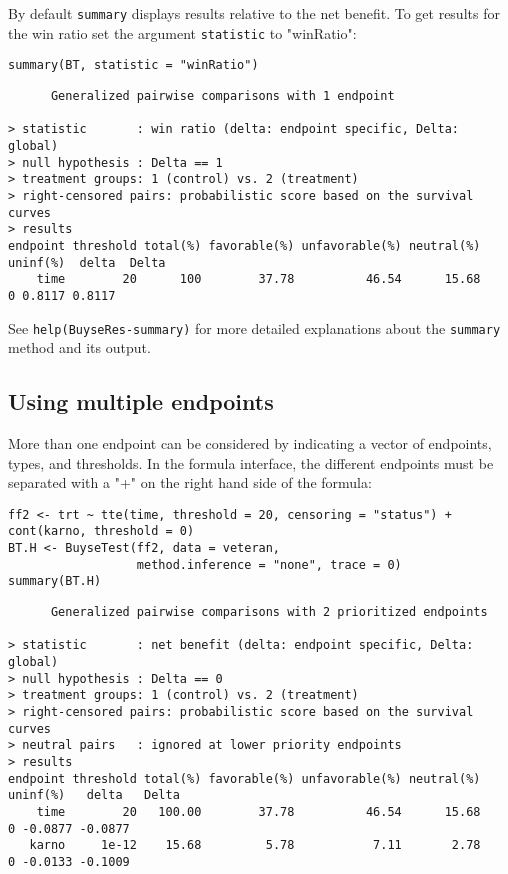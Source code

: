 \documentclass[12pt]{article}
\begin{document}
\clearpage

By default \texttt{summary} displays results relative to the net benefit. To
get results for the win ratio set the argument \texttt{statistic} to
"winRatio":
\lstset{language=r,label= ,caption= ,captionpos=b,numbers=none}
\begin{lstlisting}
summary(BT, statistic = "winRatio")
\end{lstlisting}

\begin{verbatim}
      Generalized pairwise comparisons with 1 endpoint

> statistic       : win ratio (delta: endpoint specific, Delta: global) 
> null hypothesis : Delta == 1 
> treatment groups: 1 (control) vs. 2 (treatment) 
> right-censored pairs: probabilistic score based on the survival curves
> results
endpoint threshold total(%) favorable(%) unfavorable(%) neutral(%) uninf(%)  delta  Delta
    time        20      100        37.78          46.54      15.68        0 0.8117 0.8117
\end{verbatim}

See \texttt{help(BuyseRes-summary)} for more detailed explanations about the
\texttt{summary} method and its output.

\subsection{Using multiple endpoints}
\label{sec:org3bee821}
More than one endpoint can be considered by indicating a vector of
endpoints, types, and thresholds. In the formula interface, the
different endpoints must be separated with a "+" on the right hand
side of the formula:
\lstset{language=r,label= ,caption= ,captionpos=b,numbers=none}
\begin{lstlisting}
ff2 <- trt ~ tte(time, threshold = 20, censoring = "status") + cont(karno, threshold = 0)
BT.H <- BuyseTest(ff2, data = veteran, 
				  method.inference = "none", trace = 0)
summary(BT.H)
\end{lstlisting}

\begin{verbatim}
      Generalized pairwise comparisons with 2 prioritized endpoints

> statistic       : net benefit (delta: endpoint specific, Delta: global) 
> null hypothesis : Delta == 0 
> treatment groups: 1 (control) vs. 2 (treatment) 
> right-censored pairs: probabilistic score based on the survival curves
> neutral pairs   : ignored at lower priority endpoints
> results
endpoint threshold total(%) favorable(%) unfavorable(%) neutral(%) uninf(%)   delta   Delta
    time        20   100.00        37.78          46.54      15.68        0 -0.0877 -0.0877
   karno     1e-12    15.68         5.78           7.11       2.78        0 -0.0133 -0.1009
\end{verbatim}
\end{document}
